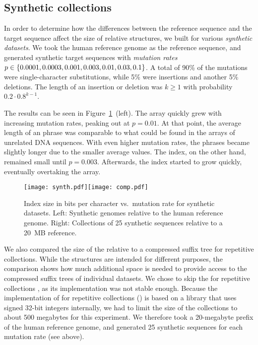 \subsection{Synthetic collections}

In order to determine how the differences between the reference sequence and
the target sequence affect the size of relative structures, we built \RCST{}
for various \emph{synthetic datasets}. We took the human reference genome as
the reference sequence, and generated synthetic target sequences with
\emph{mutation rates} $p \in \{ 0.0001, 0.0003, 0.001, 0.003, 0.01, 0.03,
0.1 \}$. A total of 90\% of the mutations were single-character substitutions,
while 5\% were insertions and another 5\% deletions. The length of an
insertion or deletion was $k \ge 1$ with probability $0.2 \cdot 0.8^{k-1}$.

The results can be seen in Figure~\ref{fig:synthetic}~(left). The \RLCP{}
array quickly grew with increasing mutation rates, peaking out at $p = 0.01$.
At that point, the average length of an \RLZ{} phrase was comparable to what
could be found in the \DLCP{} arrays of unrelated DNA sequences. With even
higher mutation rates, the phrases became slightly longer due to the smaller
average \LCP{} values. The \RFM{} index, on the other hand, remained small
until $p = 0.003$. Afterwards, the index started to grow quickly, eventually
overtaking the \RLCP{} array.

\begin{figure}
\begin{center}
\texttt{[image: synth.pdf]}\hspace{-0.4in}\texttt{[image: comp.pdf]}
\end{center}
\caption{Index size in bits per character vs.~mutation rate for synthetic
datasets. Left: Synthetic genomes relative to the human reference genome.
Right: Collections of 25 synthetic sequences relative to a 20~MB
reference.}\label{fig:synthetic}
\end{figure}

We also compared the size of the relative \CST{} to a compressed suffix tree
for repetitive collections. While the structures are intended for different
purposes, the comparison shows how much additional space is needed to provide
access to the compressed suffix trees of individual datasets. We chose to skip
the \CSTnpr{} for repetitive collections \cite{Abeliuk2013}, as its
implementation was not stable enough. Because the implementation of \CSTsada{}
for repetitive collections (\GCT) \cite{Navarro2015} is based on a library
that uses signed 32\nobreakdash-bit integers internally, we had to limit the
size of the collections to about 500 megabytes for this experiment. We
therefore took a 20\nobreakdash-megabyte prefix of the human reference genome,
and generated 25 synthetic sequences for each mutation rate (see above).


